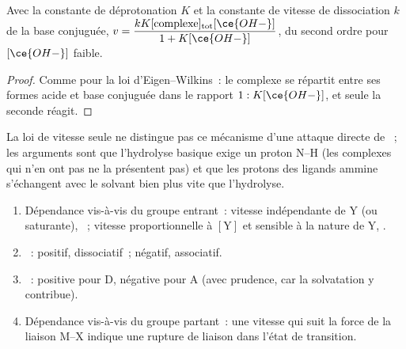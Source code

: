 \begin{proposition}\label{prop:b3:complex-mechanisms:conjugate-base}
Avec la constante de déprotonation $K$ et la constante de vitesse de
dissociation $k$ de la base conjuguée, $v = \dfrac{kK[\text{complexe}]_{\mathrm{tot}}[\ce{OH-}]}{1 + K[\ce{OH-}]}$, du second ordre pour $[\ce{OH-}]$ faible.
\end{proposition}

\begin{proof}
Comme pour la loi d'Eigen--Wilkins~: le complexe se répartit entre ses
formes acide et base conjuguée dans le rapport $1 : K[\ce{OH-}]$, et seule
la seconde réagit.
\end{proof}

La loi de vitesse seule ne distingue pas ce mécanisme d'une attaque directe
de ~; les arguments sont que l'hydrolyse basique exige un proton
N--H (les complexes qui n'en ont pas ne la présentent pas) et que les
protons des ligands ammine s'échangent avec le solvant bien plus vite que
l'hydrolyse.

\begin{method}\label{met:b3:complex-mechanisms:diagnose}
\begin{enumerate}
  \item Dépendance vis-à-vis du groupe entrant~: vitesse indépendante de Y
        (ou saturante), ~; vitesse proportionnelle à
        $[\mathrm Y]$ et sensible à la nature de Y, .
  \item {}~: positif, dissociatif~; négatif, associatif.
  \item {}~: positive pour D, négative pour A (avec
        prudence, car la solvatation y contribue).
  \item Dépendance vis-à-vis du groupe partant~: une vitesse qui suit la
        force de la liaison M--X indique une rupture de liaison dans l'état
        de transition.
\end{enumerate}
\end{method}

